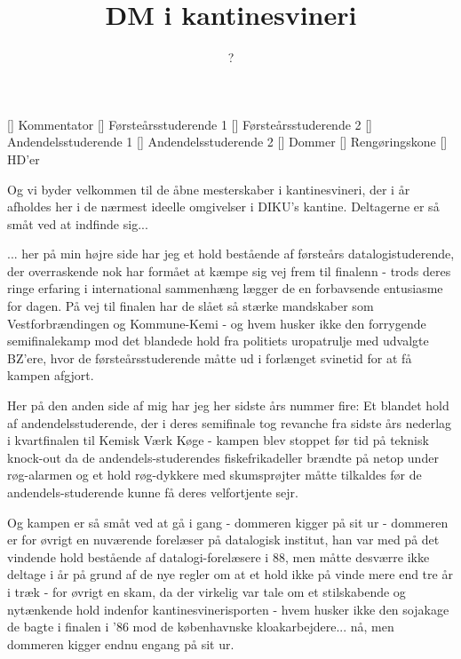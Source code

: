 \documentclass[a4paper,11pt]{article}
\title{DM i kantinesvineri}
\author{?}
\begin{document}
\maketitle

\begin{roles}
[] Kommentator
[] Førsteårsstuderende 1
[] Førsteårsstuderende 2
[] Andendelsstuderende 1
[] Andendelsstuderende 2
[] Dommer
[] Rengøringskone
[] HD'er
\end{roles}

\begin{sketch}

   Og vi byder velkommen til de åbne mesterskaber i
  kantinesvineri, der i år afholdes her i de nærmest ideelle
  omgivelser i DIKU's kantine.  Deltagerne er så småt ved at
  indfinde sig...


   ... her på min højre side har jeg et hold bestående af
  førsteårs datalogistuderende, der overraskende nok har formået at
  kæmpe sig vej frem til finalenn - trods deres ringe erfaring i
  international sammenhæng lægger de en forbavsende entusiasme for
  dagen.  På vej til finalen har de slået så stærke mandskaber som
  Vestforbrændingen og Kommune-Kemi - og hvem husker ikke den
  forrygende semifinalekamp mod det blandede hold fra politiets
  uropatrulje med udvalgte BZ'ere, hvor de førsteårsstuderende måtte
  ud i forlænget svinetid for at få kampen afgjort.


   Her på den anden side af mig har jeg her sidste års nummer
  fire: Et blandet hold af andendelsstuderende, der i deres semifinale
  tog revanche fra sidste års nederlag i kvartfinalen til Kemisk Værk
  Køge - kampen blev stoppet før tid på teknisk knock-out da de
  andendels-studerendes fiskefrikadeller brændte på netop under
  røg-alarmen og et hold røg-dykkere med skumsprøjter måtte tilkaldes
  før de andendels-studerende kunne få deres velfortjente sejr.

   Og kampen er så småt ved at gå i gang - dommeren kigger på
  sit ur - dommeren er for øvrigt en nuværende forelæser på datalogisk
  institut, han var med på det vindende hold bestående af
  datalogi-forelæsere i 88, men måtte desværre ikke deltage i år på
  grund af de nye regler om at et hold ikke på vinde mere end tre år i
  træk - for øvrigt en skam, da der virkelig var tale om et
  stilskabende og nytænkende hold indenfor kantinesvinerisporten -
  hvem husker ikke den sojakage de bagte i finalen i '86 mod de
  københavnske kloakarbejdere... nå, men dommeren kigger endnu engang
  på sit ur.


\end{sketch}
\end{document}
